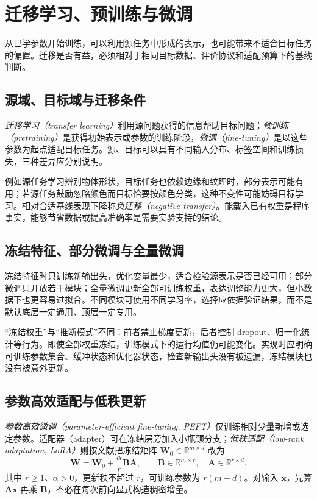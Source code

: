 \setcounter{chapter}{15} %
\chapter{迁移学习、预训练与微调}
\label{chap:dl-transfer}
从已学参数开始训练，可以利用源任务中形成的表示，也可能带来不适合目标任务的偏置。迁移是否有益，必须相对于相同目标数据、评价协议和适配预算下的基线判断。

\section{源域、目标域与迁移条件}
\emph{迁移学习（transfer learning）}利用源问题获得的信息帮助目标问题；\emph{预训练（pretraining）}是获得初始表示或参数的训练阶段，\emph{微调（fine-tuning）}是以这些参数为起点适配目标任务。源、目标可以具有不同输入分布、标签空间和训练损失，三种差异应分别说明。

例如源任务学习辨别物体形状，目标任务也依赖边缘和纹理时，部分表示可能有用；若源任务鼓励忽略颜色而目标恰要按颜色分类，这种不变性可能妨碍目标学习。相对合适基线表现下降称\emph{负迁移（negative transfer）}。能载入已有权重是程序事实，能够节省数据或提高准确率是需要实验支持的结论。

\section{冻结特征、部分微调与全量微调}
冻结特征时只训练新输出头，优化变量最少，适合检验源表示是否已经可用；部分微调只开放若干模块；全量微调更新全部可训练权重，表达调整能力更大，但小数据下也更容易过拟合。不同模块可使用不同学习率，选择应依据验证结果，而不是默认底层一定通用、顶层一定专用。

“冻结权重”与“推断模式”不同：前者禁止梯度更新，后者控制 dropout、归一化统计等行为。即使全部权重冻结，训练模式下的运行均值仍可能变化。实现时应明确可训练参数集合、缓冲状态和优化器状态，检查新输出头没有被遗漏，冻结模块也没有被意外更新。

\section{参数高效适配与低秩更新}
\emph{参数高效微调（parameter-efficient fine-tuning, PEFT）}仅训练相对少量新增或选定参数。适配器（adapter）可在冻结层旁加入小瓶颈分支；\emph{低秩适配（low-rank adaptation, LoRA）}则按文献\cite{hu2021}把冻结矩阵 $\mathbf W_0\in\mathbb R^{m\times d}$ 改为
\begin{equation}
\mathbf W=\mathbf W_0+\frac\alpha r\mathbf B\mathbf A,
\qquad \mathbf B\in\mathbb R^{m\times r},\quad\mathbf A\in\mathbb R^{r\times d}.
\label{eq:dl-low-rank}
\end{equation}
其中 $r\geq1$、$\alpha>0$，更新秩不超过 $r$，可训练参数为 $r(m+d)$。对输入 $\mathbf x$，先算 $\mathbf A\mathbf x$ 再乘 $\mathbf B$，不必在每次前向显式构造稠密增量。

